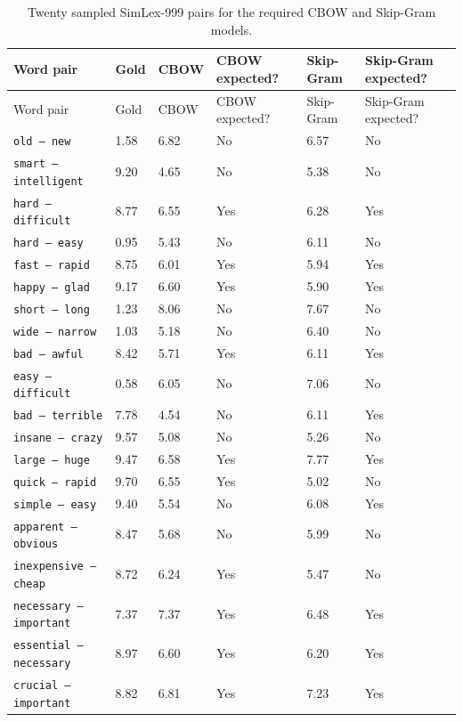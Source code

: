 \documentclass[11pt,a4paper]{article}
\begin{document}
\begin{longtable}{p{}p{}p{}p{}p{}p{}}
    \caption{Twenty sampled SimLex-999 pairs for the required CBOW and Skip-Gram models.} \label{tab:simlex-samples} \\
    \toprule
    Word pair & Gold & CBOW & CBOW expected? & Skip-Gram & Skip-Gram expected? \\
    \midrule
    \endfirsthead
    \toprule
    Word pair & Gold & CBOW & CBOW expected? & Skip-Gram & Skip-Gram expected? \\
    \midrule
    \endhead
    \texttt{old -- new} & 1.58 & 6.82 & No & 6.57 & No \\
    \texttt{smart -- intelligent} & 9.20 & 4.65 & No & 5.38 & No \\
    \texttt{hard -- difficult} & 8.77 & 6.55 & Yes & 6.28 & Yes \\
    \texttt{hard -- easy} & 0.95 & 5.43 & No & 6.11 & No \\
    \texttt{fast -- rapid} & 8.75 & 6.01 & Yes & 5.94 & Yes \\
    \texttt{happy -- glad} & 9.17 & 6.60 & Yes & 5.90 & Yes \\
    \texttt{short -- long} & 1.23 & 8.06 & No & 7.67 & No \\
    \texttt{wide -- narrow} & 1.03 & 5.18 & No & 6.40 & No \\
    \texttt{bad -- awful} & 8.42 & 5.71 & Yes & 6.11 & Yes \\
    \texttt{easy -- difficult} & 0.58 & 6.05 & No & 7.06 & No \\
    \texttt{bad -- terrible} & 7.78 & 4.54 & No & 6.11 & Yes \\
    \texttt{insane -- crazy} & 9.57 & 5.08 & No & 5.26 & No \\
    \texttt{large -- huge} & 9.47 & 6.58 & Yes & 7.77 & Yes \\
    \texttt{quick -- rapid} & 9.70 & 6.55 & Yes & 5.02 & No \\
    \texttt{simple -- easy} & 9.40 & 5.54 & No & 6.08 & Yes \\
    \texttt{apparent -- obvious} & 8.47 & 5.68 & No & 5.99 & No \\
    \texttt{inexpensive -- cheap} & 8.72 & 6.24 & Yes & 5.47 & No \\
    \texttt{necessary -- important} & 7.37 & 7.37 & Yes & 6.48 & Yes \\
    \texttt{essential -- necessary} & 8.97 & 6.60 & Yes & 6.20 & Yes \\
    \texttt{crucial -- important} & 8.82 & 6.81 & Yes & 7.23 & Yes \\
    \bottomrule
\end{longtable}
\end{document}
